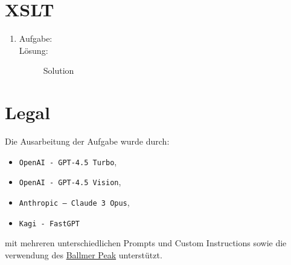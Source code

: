\documentclass[a4paper,11pt]{report}
\begin{document}
    
\chapter{XSLT}
\begin{enumerate}
    \item \hfill %
    \begin{description}
        \item[Aufgabe:]
         \hfill
        \item[Lösung:] \hfill \newline %
            Solution
    \end{description}
\end{enumerate}
\newpage

\chapter{Legal}
Die Ausarbeitung der Aufgabe wurde durch:
\begin{itemize}
    \item \texttt{OpenAI - GPT-4.5 Turbo}, 
    \item \texttt{OpenAI - GPT-4.5 Vision}, 
    \item \texttt{Anthropic -- Claude 3 Opus}, 
    \item \texttt{Kagi - FastGPT}
\end{itemize}
mit mehreren unterschiedlichen Prompts und Custom Instructions sowie die verwendung des \href{https://xkcd.com/323/}{Ballmer Peak} unterstützt.
\end{document}
